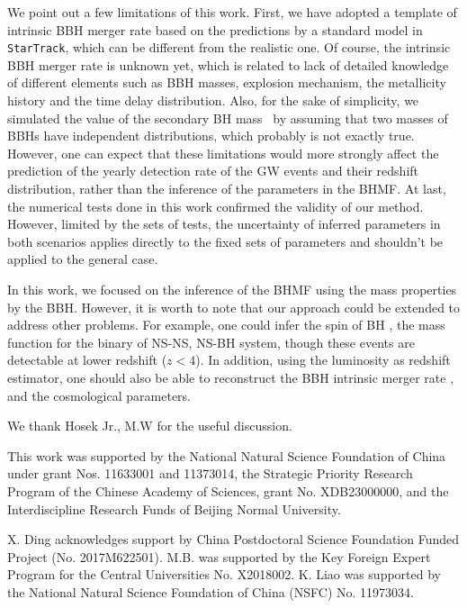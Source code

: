 \documentclass[twocolumn]{aastex62}
\newcommand{\blue}[1]{{#1}}
\begin{document}
We point out a few limitations of this work. First, we have adopted a template of intrinsic BBH merger rate based on the predictions by a standard model in {\tt StarTrack}, which can be different from the realistic one. Of course, the intrinsic BBH merger rate is unknown yet, which is related to 
lack of detailed knowledge of different elements such as BBH masses, explosion mechanism, the metallicity history and the time delay distribution. Also, for the sake of simplicity, we simulated the value of the secondary BH mass \mtwo\ by assuming that two masses of BBHs have independent distributions, which probably is not exactly true. However, one can expect that these limitations would more strongly affect the prediction of the yearly detection rate of the GW events and their redshift distribution, rather than the inference of the parameters in the BHMF.
\blue{At last, the numerical tests done in this work confirmed the validity of our method. However, limited by the sets of tests, the uncertainty of inferred parameters  in both scenarios applies directly to the fixed sets of parameters and shouldn't be applied to the general case.}

In this work, we focused on the inference of the BHMF using the mass properties by the BBH. However, it is worth to note that our approach could be extended to address other problems. For example, one could infer the spin of BH \citep{Abbott2018b}, the mass function for the binary of NS-NS, NS-BH system, though these events are detectable at lower redshift ($z<4$). In addition, using the luminosity as redshift estimator, one should also be able to reconstruct the BBH intrinsic merger rate \citep{Fishbach2018}, and the cosmological parameters.


\acknowledgments
We thank Hosek Jr., M.W for the useful discussion.

This work was supported by the National Natural Science Foundation of China under grant Nos. 11633001 and 11373014, the Strategic Priority Research Program of the Chinese Academy of Sciences, grant No. XDB23000000, and the Interdiscipline Research Funds of Beijing Normal University.

X. Ding acknowledges support by China Postdoctoral Science Foundation Funded Project (No. 2017M622501).
M.B. was supported by the Key Foreign Expert Program for the Central Universities No. X2018002.
K. Liao was supported by the National Natural Science Foundation of China (NSFC) No. 11973034.
\end{document}
